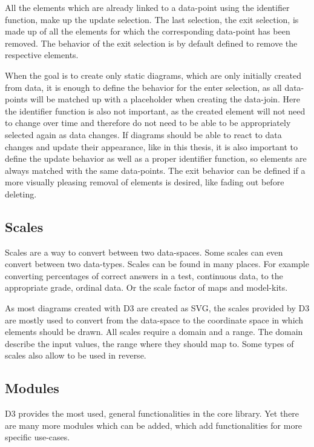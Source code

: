 All the elements which are already linked to a data-point using the identifier function, make up the update selection. The last selection, the exit selection, is made up of all the elements for which the corresponding data-point has been removed. The behavior of the exit selection is by default defined to remove the respective elements.

When the goal is to create only static diagrams, which are only initially created from data, it is enough to define the behavior for the enter selection, as all data-points will be matched up with a placeholder when creating the data-join. Here the identifier function is also not important, as the created element will not need to change over time and therefore do not need to be able to be appropriately selected again as data changes. If diagrams should be able to react to data changes and update their appearance, like in this thesis, it is also important to define the update behavior as well as a proper identifier function, so elements are always matched with the same data-points. The exit behavior can be defined if a more visually pleasing removal of elements is desired, like fading out before deleting.


\subsection{Scales}

Scales are a way to convert between two data-spaces. Some scales can even convert between two data-types. Scales can be found in many places. For example converting percentages of correct answers in a test, continuous data, to the appropriate grade, ordinal data. Or the scale factor of maps and model-kits.

As most diagrams created with D3 are created as SVG, the scales provided by D3 are mostly used to convert from the data-space to the coordinate space in which elements should be drawn. All scales require a domain and a range. The domain describe the input values, the range where they should map to. Some types of scales also allow to be used in reverse. 

\subsection{Modules}

D3 provides the most used, general functionalities in the core library. Yet there are many more modules which can be added, which add functionalities for more specific use-cases.
